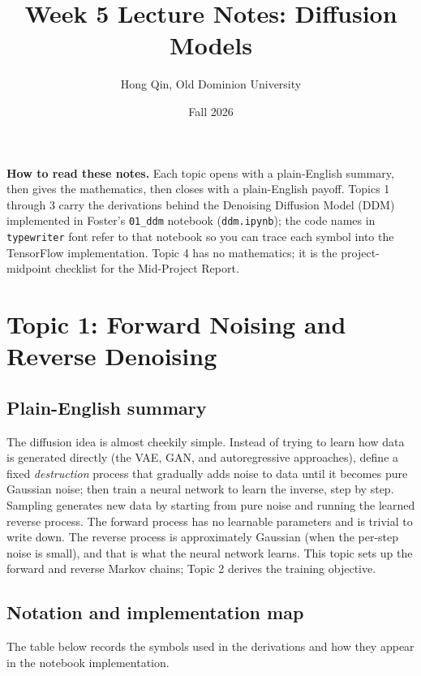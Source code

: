 \documentclass[11pt]{article}
\title{Week 5 Lecture Notes: Diffusion Models}
\author{Hong Qin, Old Dominion University}
\date{Fall 2026}
\theoremstyle{remark}
\begin{document}
\maketitle
\tableofcontents
\bigskip

\noindent\textbf{How to read these notes.} Each topic opens with a plain-English summary, then gives the mathematics, then closes with a plain-English payoff. Topics 1 through 3 carry the derivations behind the Denoising Diffusion Model (DDM) implemented in Foster's \texttt{01\_ddm} notebook (\texttt{ddm.ipynb}); the code names in \texttt{typewriter} font refer to that notebook so you can trace each symbol into the TensorFlow implementation. Topic 4 has no mathematics; it is the project-midpoint checklist for the Mid-Project Report.

\section{Topic 1: Forward Noising and Reverse Denoising}

\subsection{Plain-English summary}

The diffusion idea is almost cheekily simple. Instead of trying to learn how data is generated directly (the VAE, GAN, and autoregressive approaches), define a fixed \emph{destruction} process that gradually adds noise to data until it becomes pure Gaussian noise; then train a neural network to learn the inverse, step by step. Sampling generates new data by starting from pure noise and running the learned reverse process. The forward process has no learnable parameters and is trivial to write down. The reverse process is approximately Gaussian (when the per-step noise is small), and that is what the neural network learns. This topic sets up the forward and reverse Markov chains; Topic 2 derives the training objective.

\subsection{Notation and implementation map}

The table below records the symbols used in the derivations and how they appear in the notebook implementation.
\end{document}
